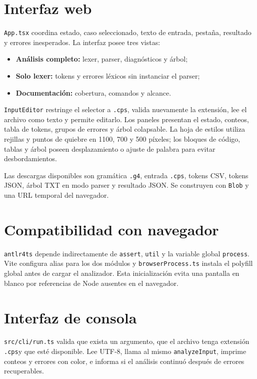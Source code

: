 \documentclass[12pt,letterpaper,oneside]{report}
\newcommand{\archivo}[1]{\texttt{#1}}
\newcommand{\cps}{\texttt{.cps}}
\begin{document}
\section{Interfaz web}

\archivo{App.tsx} coordina estado, caso seleccionado, texto de entrada, pestaña,
resultado y errores inesperados. La interfaz posee tres vistas:

\begin{itemize}
  \item \textbf{Análisis completo:} lexer, parser, diagnósticos y árbol;
  \item \textbf{Solo lexer:} tokens y errores léxicos sin instanciar el parser;
  \item \textbf{Documentación:} cobertura, comandos y alcance.
\end{itemize}

\archivo{InputEditor} restringe el selector a \cps, valida nuevamente la extensión,
lee el archivo como texto y permite editarlo. Los paneles presentan el estado,
conteos, tabla de tokens, grupos de errores y árbol colapsable. La hoja de estilos
utiliza rejillas y puntos de quiebre en 1100, 700 y 500 píxeles; los bloques de código,
tablas y árbol poseen desplazamiento o ajuste de palabra para evitar desbordamientos.

Las descargas disponibles son gramática \archivo{.g4}, entrada \cps, tokens CSV,
tokens JSON, árbol TXT en modo parser y resultado JSON. Se construyen con
\archivo{Blob} y una URL temporal del navegador.

\section{Compatibilidad con navegador}

\archivo{antlr4ts} depende indirectamente de \archivo{assert}, \archivo{util} y la
variable global \archivo{process}. Vite configura alias para los dos módulos y
\archivo{browserProcess.ts} instala el polyfill global antes de cargar el analizador.
Esta inicialización evita una pantalla en blanco por referencias de Node ausentes en
el navegador.

\section{Interfaz de consola}

\archivo{src/cli/run.ts} valida que exista un argumento, que el archivo tenga
extensión \cps y que esté disponible. Lee UTF-8, llama al mismo
\archivo{analyzeInput}, imprime conteos y errores con color, e informa si el análisis
continuó después de errores recuperables.
\end{document}
